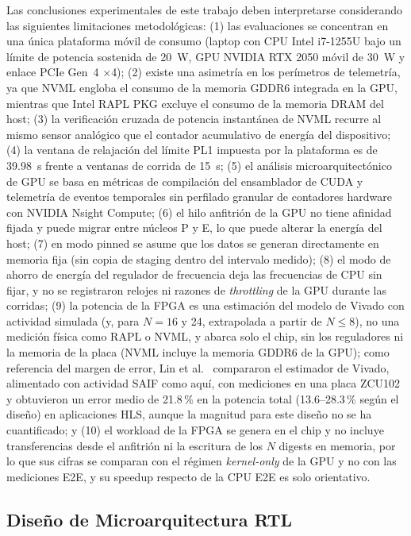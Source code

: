 \documentclass[conference]{IEEEtran}
\begin{document}
Las conclusiones experimentales de este trabajo deben interpretarse considerando las siguientes limitaciones metodológicas: (1) las evaluaciones se concentran en una única plataforma móvil de consumo (laptop con CPU Intel i7-1255U bajo un límite de potencia sostenida de 20~W, GPU NVIDIA RTX 2050 móvil de 30~W y enlace PCIe Gen~4 $\times$4); (2) existe una asimetría en los perímetros de telemetría, ya que NVML engloba el consumo de la memoria GDDR6 integrada en la GPU, mientras que Intel RAPL PKG excluye el consumo de la memoria DRAM del host; (3) la verificación cruzada de potencia instantánea de NVML recurre al mismo sensor analógico que el contador acumulativo de energía del dispositivo; (4) la ventana de relajación del límite PL1 impuesta por la plataforma es de 39.98~s frente a ventanas de corrida de 15~s; (5) el análisis microarquitectónico de GPU se basa en métricas de compilación del ensamblador de CUDA y telemetría de eventos temporales sin perfilado granular de contadores hardware con NVIDIA Nsight Compute; (6) el hilo anfitrión de la GPU no tiene afinidad fijada y puede migrar entre núcleos P y E, lo que puede alterar la energía del host; (7) en modo pinned se asume que los datos se generan directamente en memoria fija (sin copia de staging dentro del intervalo medido); (8) el modo de ahorro de energía del regulador de frecuencia deja las frecuencias de CPU sin fijar, y no se registraron relojes ni razones de \textit{throttling} de la GPU durante las corridas; (9) la potencia de la FPGA es una estimación del modelo de Vivado con actividad simulada (y, para $N=16$ y 24, extrapolada a partir de $N \leq 8$), no una medición física como RAPL o NVML, y abarca solo el chip, sin los reguladores ni la memoria de la placa (NVML incluye la memoria GDDR6 de la GPU); como referencia del margen de error, Lin et al.~\cite{lin2022powergear} compararon el estimador de Vivado, alimentado con actividad SAIF como aquí, con mediciones en una placa ZCU102 y obtuvieron un error medio de 21.8\,\% en la potencia total (13.6--28.3\,\% según el diseño) en aplicaciones HLS, aunque la magnitud para este diseño no se ha cuantificado; y (10) el workload de la FPGA se genera en el chip y no incluye transferencias desde el anfitrión ni la escritura de los $N$ digests en memoria, por lo que sus cifras se comparan con el régimen \textit{kernel-only} de la GPU y no con las mediciones E2E, y su speedup respecto de la CPU E2E es solo orientativo.

\subsection{Diseño de Microarquitectura RTL}
\end{document}

